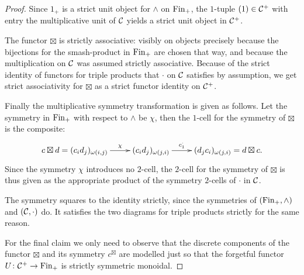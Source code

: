 {{{\begin{proof}
    Since $1_+$ is a strict unit object for $\wedge$ on $\mathrm{Fin}_+$, the
    $1$-tuple $(1)\in \mathcal{C}^+$ with entry the multiplicative unit of $\mathcal{C}$
    yields a strict unit object in $\mathcal{C}^+$. 

    The functor $\boxtimes$ is strictly associative: visibly on objects
    precisely because the bijections for the smash-product in $\mathrm{Fin}_+$
    are chosen that way, and because the multiplication on $\mathcal{C}$ was
    assumed strictly associative. Because of the strict identity of
    functors for triple products that $\cdot$ on $\mathcal{C}$ satisfies by
    assumption, we get strict associativity for $\boxtimes$ as a 
    strict functor identity on $\mathcal{C}^+$.

    Finally the multiplicative symmetry transformation is given as
    follows. Let the symmetry in $\mathrm{Fin}_+$ with respect to $\wedge$ be 
    $\chi$, then the $1$-cell for the symmetry of $\boxtimes$ is the 
    composite: \[\xymatrix{c\boxtimes d=(c_id_j)_{\omega(i,j)}
    \ar[r]^-{\chi}&(c_id_j)_{\omega(j,i)} \ar[r]^-{c^\cdot_1}
    &(d_jc_i)_{\omega(j,i)}=d\boxtimes c.}\] Since the symmetry $\chi$ 
    introduces no $2$-cell, the $2$-cell for the symmetry of $\boxtimes$ 
    is thus given as the appropriate product of the symmetry $2$-cells 
    of $\cdot$ in $\mathcal{C}$.

    The symmetry squares to the identity strictly, since the symmetries
    of $(\mathrm{Fin}_+,\wedge)$ and $(\mathcal{C},\cdot)$ do. It satisfies the two
    diagrams for triple products strictly for the same reason.

    For the final claim we only need to observe that the discrete 
    components of the functor $\boxtimes$ and its symmetry $c^\boxtimes$
    are modelled just so that the forgetful functor $U\colon \mathcal{C}^+
    \rightarrow \mathrm{Fin}_+$ is strictly symmetric monoidal. \end{proof}}}

{}

}
